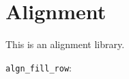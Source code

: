 \documentclass{article}
\begin{document}
\section{Alignment}
\label{sec:algn}

This is an alignment library.

\texttt{algn_fill_row}: 
\end{document}
